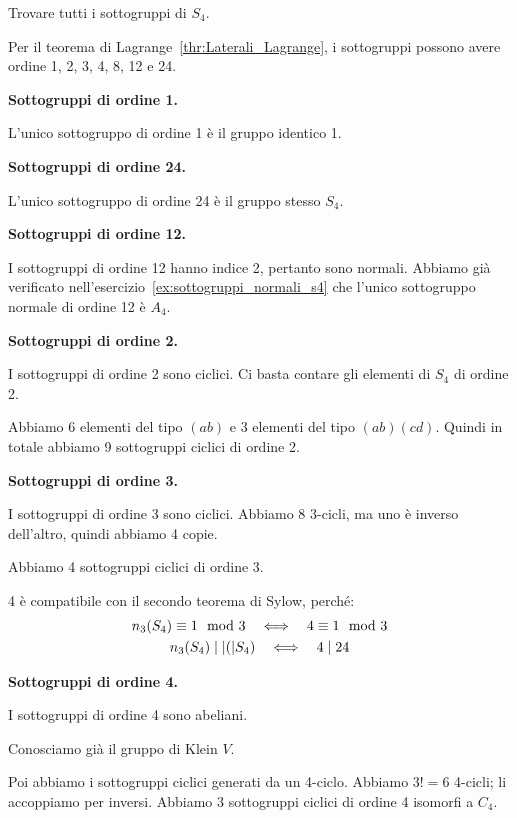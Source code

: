 \begin{esercizio}
    Trovare tutti i sottogruppi di $S_4$.
\end{esercizio}
\begin{soluzione}
    Per il teorema di Lagrange~\ref{thr:Laterali_Lagrange}, i sottogruppi possono avere ordine 1, 2, 3, 4, 8, 12 e 24.

    \bigskip
    \textbf{Sottogruppi di ordine 1.}

    L'unico sottogruppo di ordine 1 è il gruppo identico 1.

    \bigskip
    \textbf{Sottogruppi di ordine 24.}

    L'unico sottogruppo di ordine 24 è il gruppo stesso $S_4$.

    \bigskip
    \textbf{Sottogruppi di ordine 12.}

    I sottogruppi di ordine 12 hanno indice 2, pertanto sono normali.
    Abbiamo già verificato nell'esercizio~\ref{ex:sottogruppi_normali_s4} che l'unico sottogruppo normale di ordine 12 è $A_4$.

    \bigskip
    \textbf{Sottogruppi di ordine 2.}

    I sottogruppi di ordine 2 sono ciclici.
    Ci basta contare gli elementi di $S_4$ di ordine 2.

    Abbiamo 6 elementi del tipo $(ab)$ e 3 elementi del tipo $(ab)(cd)$.
    Quindi in totale abbiamo 9 sottogruppi ciclici di ordine 2.

    \bigskip
    \textbf{Sottogruppi di ordine 3.}

    I sottogruppi di ordine 3 sono ciclici.
    Abbiamo 8 3-cicli, ma uno è inverso dell'altro, quindi abbiamo 4 copie.

    Abbiamo 4 sottogruppi ciclici di ordine 3.

    4 è compatibile con il secondo teorema di Sylow, perché:
    \begin{gather*}
        n_3(S_4) \equiv 1 \mod 3 \quad\Longleftrightarrow\quad 4 \equiv 1 \mod 3 \\
        n_3(S_4) \mid \lvert ( \rvert S_4) \quad\Longleftrightarrow\quad 4 \mid 24
    \end{gather*}

    \bigskip
    \textbf{Sottogruppi di ordine 4.}

    I sottogruppi di ordine 4 sono abeliani.

    Conosciamo già il gruppo di Klein $V$.

    Poi abbiamo i sottogruppi ciclici generati da un 4-ciclo.
    Abbiamo $3! = 6$ 4-cicli;
    li accoppiamo per inversi.
    Abbiamo 3 sottogruppi ciclici di ordine 4 isomorfi a $C_4$.


\end{soluzione}
